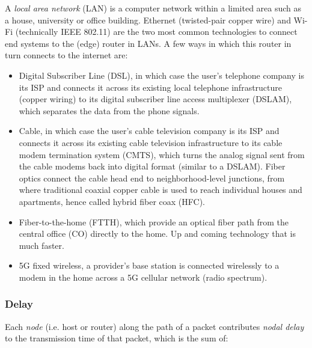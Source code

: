 \documentclass[table, xcdraw]{article}%
\begin{document}
A \emph{local area network} (LAN) is a computer network within a limited area such as a house, university or office building. Ethernet (twisted-pair copper wire) and Wi-Fi (technically IEEE 802.11) are the two most common technologies to connect end systems to the (edge) router in LANs. A few ways in which this router in turn connects to the internet are:

\begin{itemize}
    \item Digital Subscriber Line (DSL), in which case the user's telephone company is its ISP and connects it across its existing local telephone infrastructure (copper wiring) to its digital subscriber line access multiplexer (DSLAM), which separates the data from the phone signals.
    \item Cable, in which case the user's cable television company is its ISP and connects it across its existing cable television infrastructure to its cable modem termination system (CMTS), which turns the analog signal sent from the cable modems back into digital format (similar to a DSLAM). Fiber optics connect the cable head end to neighborhood-level junctions, from where traditional coaxial copper cable is used to reach individual houses and apartments, hence called hybrid fiber coax (HFC).
    \item Fiber-to-the-home (FTTH), which provide an optical fiber path from the central office (CO) directly to the home. Up and coming technology that is much faster.
    \item 5G fixed wireless, a provider’s base station is connected wirelessly to a modem in the home across a 5G cellular network (radio spectrum).
\end{itemize}

\subsubsection{Delay} \label{ch:intro:delay}

Each \emph{node} (i.e. host or router) along the path of a packet contributes \emph{nodal delay} to the transmission time of that packet, which is the sum of:
\end{document}
